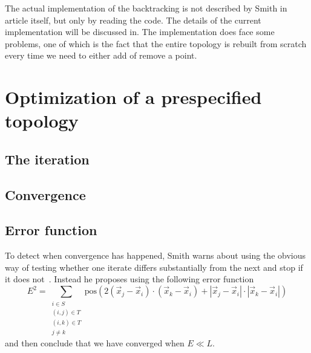 The actual implementation of the backtracking is not described by Smith in
article itself, but only by reading the code. The details of the current
implementation will be discussed in. The implementation does face some problems,
one of which is the fact that the entire topology is rebuilt from scratch every
time we need to either add of remove a point.

\section{Optimization of a prespecified topology}
\label{sec:optim-presp-topol}


\subsection{The iteration}
\label{sec:iteration}


\subsection{Convergence}
\label{sec:convergence}

\subsection{Error function}
\label{sec:error-function}

To detect when convergence has happened, Smith warns about using the obvious way
of testing whether one iterate differs substantially from the next and stop if
it does not~\cite[p.~151]{Smith1992}. Instead he proposes using the
following error function
\begin{equation}
  E^2 = \sum_{
    \begin{array}{c}
      i \in S \\
      (i,j) \in T \\
      (i,k) \in T \\
      j \ne k
    \end{array}}
  \text{pos} (2 (\vec x_j - \vec x_i) \cdot (\vec x_k - \vec x_i) +
  | \vec x_j - \vec x_i | \cdot | \vec x_k - \vec x_i |)
\end{equation}
and then conclude that we have converged when $E \ll L$.


\chapterbreak{}

